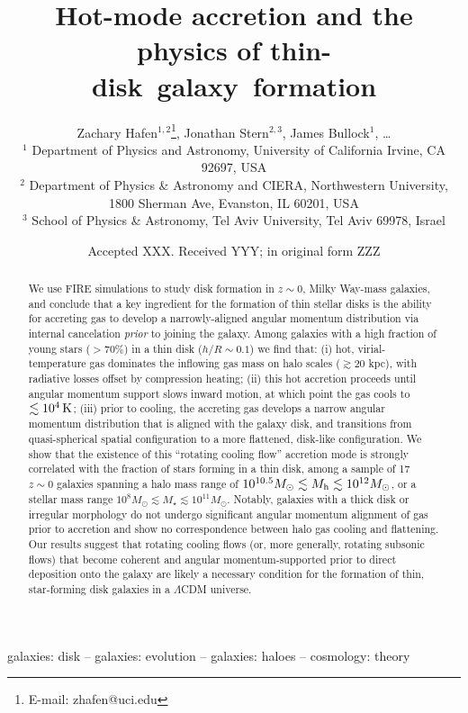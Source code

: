 \documentclass[fleqn,usenatbib]{mnras}
\title[Rotating cooling flows and thin galactic disks]{Hot-mode accretion and the physics of thin-disk~galaxy~formation}
\author[Hafen, Stern, Bullock et al.]{
Zachary Hafen$^{1,2}$\thanks{E-mail: zhafen@uci.edu},
Jonathan Stern$^{2,3}$,
James Bullock$^{1}$,
\ldots
\\
$^1$ Department of Physics and Astronomy, University of California Irvine, CA 92697, USA \\
$^2$ Department of Physics \& Astronomy and CIERA, Northwestern University, 1800 Sherman Ave, Evanston, IL 60201, USA \\
$^3$ School of Physics \& Astronomy, Tel Aviv University, Tel Aviv 69978, Israel
}
\date{Accepted XXX. Received YYY; in original form ZZZ}
\newcommand{\Nsample}{17}
\begin{document}
\label{firstpage}
\pagerange{\pageref{firstpage}--\pageref{lastpage}}
\maketitle

\begin{abstract}
We use FIRE simulations to study disk formation in $z\sim 0$, Milky Way-mass galaxies, and conclude that a key ingredient for the formation of thin stellar disks is the ability for accreting gas to develop a narrowly-aligned angular momentum distribution via internal cancelation  \textit{prior} to joining the galaxy.
Among galaxies with a high fraction of young stars ($>70\%$) in a thin disk ($h/R \sim 0.1$) we find that:
(i) hot, virial-temperature gas dominates the inflowing gas mass on halo scales ($\gtrsim 20$ kpc), with radiative losses offset by compression heating;
(ii) this hot accretion proceeds until angular momentum support slows inward motion, at which point the gas cools to $\lesssim10^4\,{\rm K}$;
(iii) prior to cooling, the accreting gas develops a narrow angular momentum distribution that is aligned with the galaxy disk, and transitions from quasi-spherical spatial configuration to a more flattened, disk-like configuration.
We show that the existence of this ``rotating cooling flow'' accretion mode is strongly correlated with the fraction of stars forming in a thin disk, among a sample of \Nsample\ $z\sim0$ galaxies spanning a halo mass range of $10^{10.5} M_\odot \lesssim M_{\rm h} \lesssim 10^{12} M_\odot$, or a stellar mass range $10^8 M_\odot \lesssim M_\star \lesssim 10^{11} M_\odot$.
Notably, galaxies with a thick disk or irregular morphology do not undergo significant angular momentum alignment of gas prior to accretion and show no correspondence between halo gas cooling and flattening.
Our results suggest that rotating cooling flows (or, more generally, rotating subsonic flows) that become coherent and angular momentum-supported prior to direct deposition onto the galaxy are likely a necessary condition for the formation of thin, star-forming disk galaxies in a $\Lambda$CDM universe.
\end{abstract}

\begin{keywords}
galaxies: disk -- galaxies: evolution -- galaxies: haloes -- cosmology: theory
\end{keywords}
\end{document}
